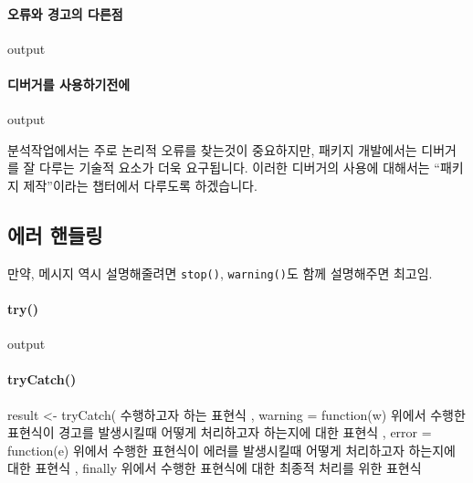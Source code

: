 \documentclass{book}
\begin{document}
\paragraph{오류와 경고의 다른점}
\begin{Schunk}
\begin{Soutput}
output
\end{Soutput}
\end{Schunk}

\paragraph{디버거를 사용하기전에}
\begin{Schunk}
\begin{Soutput}
output
\end{Soutput}
\end{Schunk}

분석작업에서는 주로 논리적 오류를 찾는것이 중요하지만, 패키지 개발에서는 디버거를 잘 다루는 기술적 요소가 더욱 요구됩니다. 
이러한 디버거의 사용에 대해서는 ``패키지 제작''이라는 챕터에서 다루도록 하겠습니다.

\subsection{에러 핸들링}
	만약, 메시지 역시 설명해줄려면  \texttt{stop()}, \texttt{warning()}도 함께 설명해주면 최고임.  
\paragraph{try()}
\begin{Schunk}
\begin{Soutput}
output
\end{Soutput}
\end{Schunk}

\paragraph{tryCatch()}

\begin{Schunk}
\begin{Soutput}
result <- tryCatch(
{
	수행하고자 하는 표현식
},
warning = function(w) {
	위에서 수행한 표현식이 경고를 발생시킬때 어떻게 처리하고자 하는지에 대한 표현식
},
error = function(e) {
	위에서 수행한 표현식이 에러를 발생시킬때 어떻게 처리하고자 하는지에 대한 표현식
}, finally {
	위에서 수행한 표현식에 대한 최종적 처리를 위한 표현식
}
\end{Soutput}
\end{Schunk}
\end{document}
